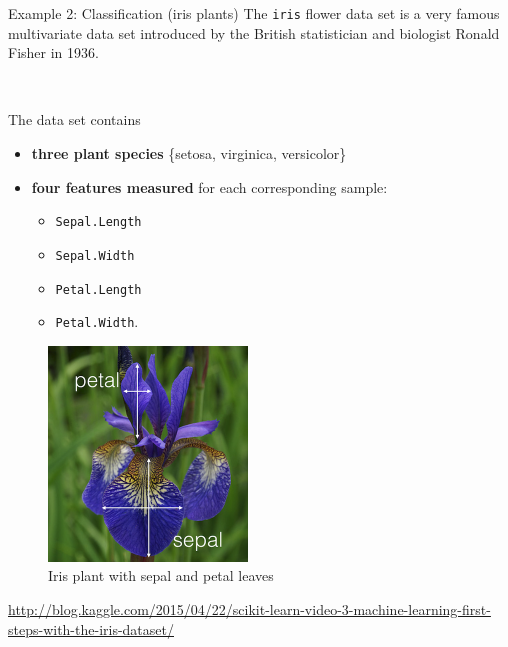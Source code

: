 \documentclass[
  10pt,
  ignorenonframetext,
]{beamer}
\providecommand{\tightlist}{%
  \setlength{\itemsep}{0pt}\setlength{\parskip}{0pt}}
\begin{document}
\begin{frame}[fragile]{Example 2: Classification (iris plants)}
\protect\hypertarget{example-2-classification-iris-plants}{}
The \texttt{iris} flower data set is a very famous multivariate data set
introduced by the British statistician and biologist Ronald Fisher in
1936.

\(~\)

The data set contains

\begin{itemize}
\tightlist
\item
  \textbf{three plant species} \{setosa, virginica, versicolor\}
\item
  \textbf{four features measured} for each corresponding sample:

  \begin{itemize}
  \tightlist
  \item
    \texttt{Sepal.Length}
  \item
    \texttt{Sepal.Width}
  \item
    \texttt{Petal.Length}
  \item
    \texttt{Petal.Width}.
  \end{itemize}
\end{itemize}
\end{frame}

\begin{frame}
\begin{figure}
\includegraphics[width=150pt]{iris} \caption{Iris plant with sepal and petal leaves}\label{fig:iris_pic}
\end{figure}

\tiny

\url{http://blog.kaggle.com/2015/04/22/scikit-learn-video-3-machine-learning-first-steps-with-the-iris-dataset/}
\end{frame}
\end{document}
